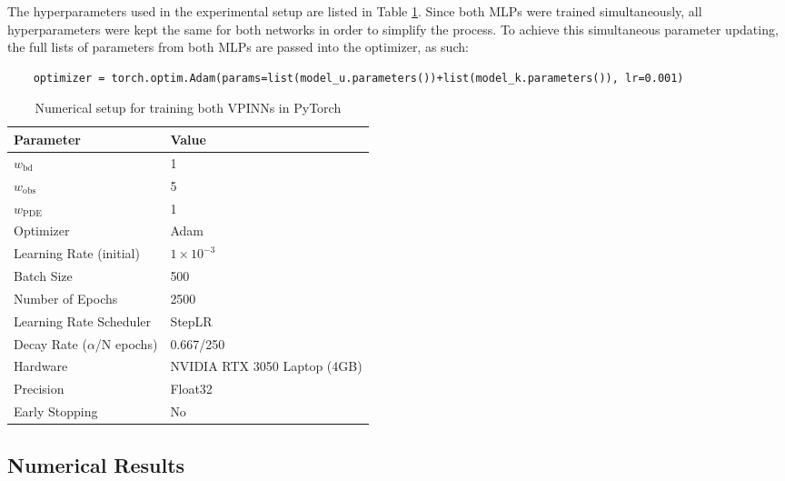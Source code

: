 The hyperparameters used in the experimental setup are listed in Table \ref{tab:training_setup_A}. Since both MLPs were trained simultaneously, all hyperparameters were kept the same for both networks in order to simplify the process. To achieve this simultaneous parameter updating, the full lists of parameters from both MLPs are passed into the optimizer, as such:

\begin{lstlisting}
	optimizer = torch.optim.Adam(params=list(model_u.parameters())+list(model_k.parameters()), lr=0.001)
\end{lstlisting}

\begin{table}[H]
\centering
\caption{Numerical setup for training both VPINNs in PyTorch}
\label{tab:training_setup_A}
\begin{tabular}{ll}
\hline
\textbf{Parameter} & \textbf{Value} \\
\hline
$w_\mathrm{bd}$     & 1 \\
$w_\mathrm{obs}$    & 5 \\
$w_\mathrm{PDE}$    & 1 \\
Optimizer           & Adam \\
Learning Rate (initial)       & $1 \times 10^{-3}$ \\
Batch Size          & 500 \\
Number of Epochs    & 2500 \\
Learning Rate Scheduler & StepLR \\
Decay Rate ($\alpha$/N epochs) &  0.667/250\\
Hardware            & NVIDIA RTX 3050 Laptop (4GB) \\
Precision           & Float32 \\
Early Stopping      & No \\
\hline
\end{tabular}
\end{table}

%
\subsection{Numerical Results}

